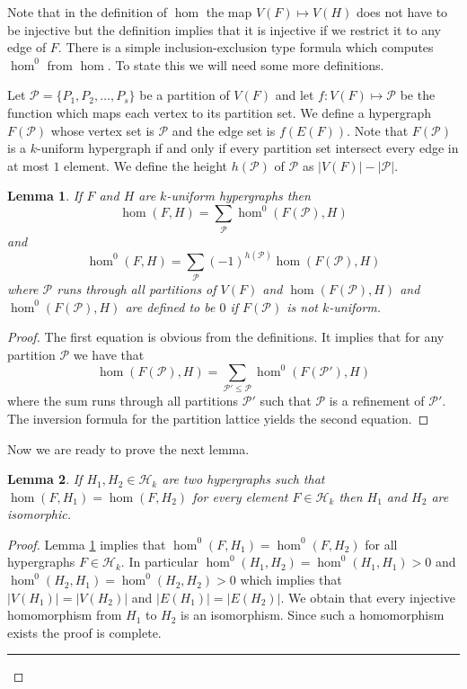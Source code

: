 \documentclass [11pt] {article}
\newcommand{\qed} {\hspace {0.1in} \rule {1.5mm} {3.5mm}}
\newtheorem{lemma}{Lemma}[section]
\begin{document}
Note that in the definition of $\hom$ the map $V(F)\mapsto V(H)$ does not
have to be injective but the definition implies that it is injective if we
restrict it to any edge of $F$. There is a simple inclusion-exclusion type
formula which computes $\hom^0$ from $\hom$. To state this we will need
some more definitions.

Let $\mathcal{P}=\{P_1,P_2,\dots,P_s\}$ be a partition of $V(F)$ and let
 $f:V(F)\mapsto\mathcal{P}$ be the function which maps each vertex to its
partition set. We define a hypergraph $F(\mathcal{P})$ whose vertex set is
$\mathcal{P}$ and the edge set is $f(E(F))$. Note that $F(\mathcal{P})$ is a
$k$-uniform hypergraph if and only if every partition set intersect every
edge in at most $1$ element. We define the height $h(\mathcal{P})$ of
$\mathcal{P}$ as $|V(F)|-|\mathcal{P}|$.

\begin{lemma}\label{hom1} If $F$ and $H$ are $k$-uniform hypergraphs then
$$\hom(F,H)=\sum_{\mathcal{P}}\hom^0(F(\mathcal{P}),H)$$
and
$$\hom^0(F,H)=\sum_{\mathcal{P}}(-1)^{h(\mathcal{P})}\hom(F(\mathcal{P}),H)$$
where $\mathcal{P}$ runs through all partitions of $V(F)$
and $\hom(F(\mathcal{P}),H)$ and $\hom^0(F(\mathcal{P}),H)$ are defined to
be $0$ if $F(\mathcal{P})$ is not $k$-uniform.
\end{lemma}

\begin{proof}
The first equation is obvious from the definitions.
It implies that for any partition $\mathcal{P}$
we have that
$$\hom(F(\mathcal{P}),H)=
\sum_{\mathcal{P}'\leq\mathcal{P}}\hom^0(F(\mathcal{P}'),H)$$
where the sum runs through all partitions $\mathcal{P}'$ such that
$\mathcal{P}$ is a refinement of $\mathcal{P}'$. The inversion formula for
the partition lattice yields the second equation.
\end{proof}

Now we are ready to prove the next lemma.

\begin{lemma}\label{hom2} If $H_1,H_2\in\mathcal{H}_k$ are two hypergraphs
such that $\hom(F,H_1)=\hom(F,H_2)$ for every element $F\in\mathcal{H}_k$
then $H_1$ and $H_2$ are isomorphic.
\end{lemma}

\begin{proof} Lemma \ref{hom1} implies that $\hom^0(F,H_1)=\hom^0(F,H_2)$
for all hypergraphs $F\in\mathcal{H}_k$. In particular $\hom^0(H_1,H_2)=
\hom^0(H_1,H_1)>0$ and $\hom^0(H_2,H_1)=\hom^0(H_2,H_2)>0$ which implies
that $|V(H_1)|=|V(H_2)|$ and $|E(H_1)|=|E(H_2)|$. We obtain that every
injective homomorphism from $H_1$ to $H_2$ is an isomorphism. Since
 such a homomorphism exists the proof is complete.
\qed \end{proof}
\end{document}
